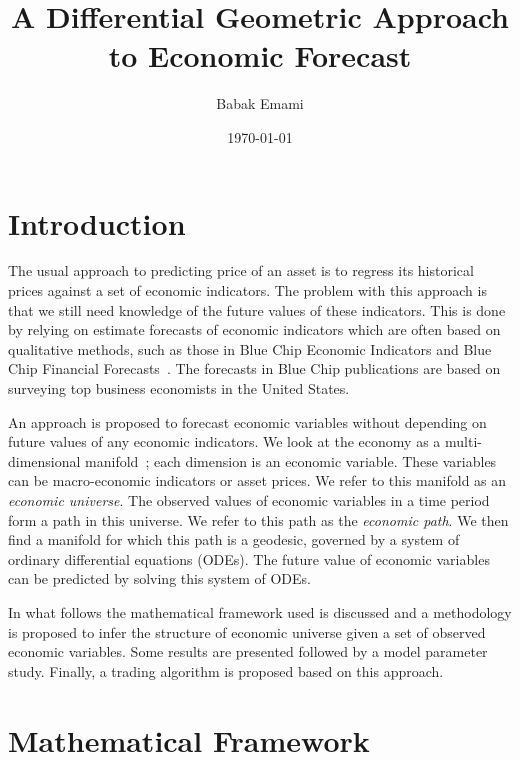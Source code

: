 \documentclass{article}
\title{A Differential Geometric Approach to Economic Forecast}
\author{Babak Emami}
\date{\today}
\begin{document}
\maketitle

\begin{abstract}


\end{abstract}

\section{Introduction}\label{section:introduction}

The usual approach to predicting price of an asset is to regress its
historical prices against a set of economic indicators. The problem
with this approach is that we still need knowledge of the future
values of these indicators. This is done by relying on estimate
forecasts of economic indicators which are often based on qualitative
methods, such as those in Blue Chip Economic Indicators and Blue Chip
Financial Forecasts~\cite{ref:blue-chip}. The forecasts in Blue Chip
publications are based on surveying top business economists in the
United States.

An approach is proposed to forecast economic variables without
depending on future values of any economic indicators. We look at the
economy as a multi-dimensional manifold~\cite{deFelice:1990}; each
dimension is an economic variable. These variables can be
macro-economic indicators or asset prices. We refer to this manifold
as an \textit{economic universe}. The observed values of economic
variables in a time period form a path in this universe. We refer to
this path as the \textit{economic path}. We then find a manifold for
which this path is a geodesic, governed by a system of ordinary
differential equations (ODEs). The future value of economic variables
can be predicted by solving this system of ODEs.

In what follows the mathematical framework used is discussed and a
methodology is proposed to infer the structure of economic universe
given a set of observed economic variables. Some results are presented
followed by a model parameter study. Finally, a trading algorithm is
proposed based on this approach.

\section{Mathematical Framework}\label{section:mathematical-framework}
\end{document}
